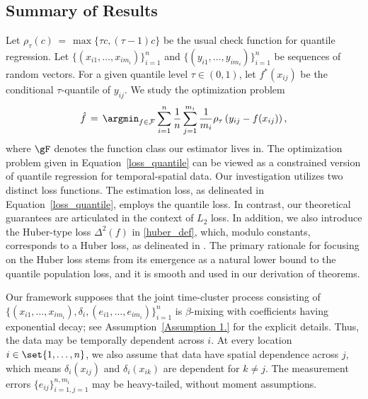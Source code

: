 \documentclass[twoside,11pt]{article}
\newcommand{\rev}[1]{{\color{revisionred}#1}}
\begin{document}
\subsection{Summary of Results}
\rev{Let $ \rho_\tau (c) \,=\, \max\{\tau c, (\tau-1)c\} $ be the usual check function for quantile regression. Let $\{ (x_{i1}, \dots, x_{im_i}) \}^{n}_{i=1}$ and $\{ (y_{i1}, \dots, y_{im_i}) \}^{n}_{i=1}$ be sequences of random vectors. For a given quantile level $\tau \in (0, 1)$, let $f^{*}(x_{ij})$ be the conditional $\tau$-quantile of $y_{ij}$. We study the optimization problem}
\begin{align}
\label{loss_quantile}
\hat f \,=\, \argmin_{f \in \mathcal{F}} \sum_{i=1}^{n} \frac{1}{n}\sum_{j=1}^{m_i} \frac{1}{m_i} \rho_\tau\left( y_{ij} - f(x_{ij}) \right),
\end{align}
where $\gF$ denotes the function class our estimator lives in. 
The optimization problem given in Equation~\eqref{loss_quantile} can be viewed as
a constrained version of quantile regression for temporal-spatial data.
Our investigation utilizes two distinct loss functions. The estimation loss, as delineated in Equation~\eqref{loss_quantile}, employs the quantile loss. In contrast, our theoretical guarantees are articulated in the context of $L_2$ loss. In addition, we also introduce the Huber-type loss $\Delta^2(f)$ in \eqref{huber_def}, 
which, modulo constants, corresponds to a Huber loss, as delineated in \cite{huber1992robust}. The primary rationale for focusing on the Huber loss stems from its emergence as a natural lower bound to the quantile population loss, and it is smooth and used in our derivation of theorems.


\rev{Our framework supposes that the joint time-cluster process consisting of $\{(x_{i1}, \dots, x_{im_i}),\delta_i,(e_{i1},\dots,e_{im_i})\}_{i=1}^n$ is $\beta$-mixing with coefficients having exponential decay; see Assumption~\ref{Assumption 1.} for the explicit details. Thus, the data may be temporally dependent across $i$.} At every location $i \in \set{1, \dots, n}$, we also assume that data have spatial dependence across $j$, which means $\delta_i(x_{ij})$ and $\delta_i(x_{ik})$ are dependent for $k\neq j$.
\rev{The measurement errors $\{e_{ij}\}_{i=1,j=1}^{n,m_i}$ may be heavy-tailed, without moment assumptions.}
\end{document}
